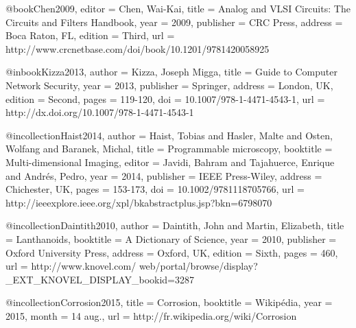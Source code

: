 
@book{Chen2009,
editor = {Chen, Wai-Kai},
title = {Analog and {VLSI} Circuits: The Circuits and Filters Handbook},
year = {2009},
publisher = {{CRC} Press},
address = {Boca Raton, FL},
edition = {Third},
url = {http://www.crcnetbase.com/doi/book/10.1201/9781420058925}
}




@inbook{Kizza2013,
author = {Kizza, Joseph Migga},
title = {Guide to Computer Network Security},
year = {2013},
publisher = {Springer},
address = {London, UK},
edition = {Second},
pages = {119-120},
doi = {10.1007/978-1-4471-4543-1},
url = {http://dx.doi.org/10.1007/978-1-4471-4543-1}
}




@incollection{Haist2014,
author = {Haist, Tobias and Hasler, Malte and Osten, Wolfang and Baranek, Michal},
title = {Programmable microscopy},
booktitle = {Multi-dimensional Imaging},
editor = {Javidi, Bahram and Tajahuerce, Enrique and Andrés, Pedro},
year = {2014},
publisher = {{IEEE} Press-Wiley},
address = {Chichester, UK},
pages = {153-173},
doi = {10.1002/9781118705766},
url = {http://ieeexplore.ieee.org/xpl/bkabstractplus.jsp?bkn=6798070}
}




@incollection{Daintith2010,
author = {Daintith, John and Martin, Elizabeth},
title = {Lanthanoids},
booktitle = {A Dictionary of Science},
year = {2010},
publisher = {Oxford University Press},
address = {Oxford, UK},
edition = {Sixth},
pages = {460},
url = {http://www.knovel.com/ web/portal/browse/display?_EXT_KNOVEL_DISPLAY_bookid=3287}
}




@incollection{Corrosion2015,
title = {Corrosion},
booktitle = {Wikipédia},     	
year = {2015},
month = {14 aug.},          	
url = {http://fr.wikipedia.org/wiki/Corrosion}    		
}

